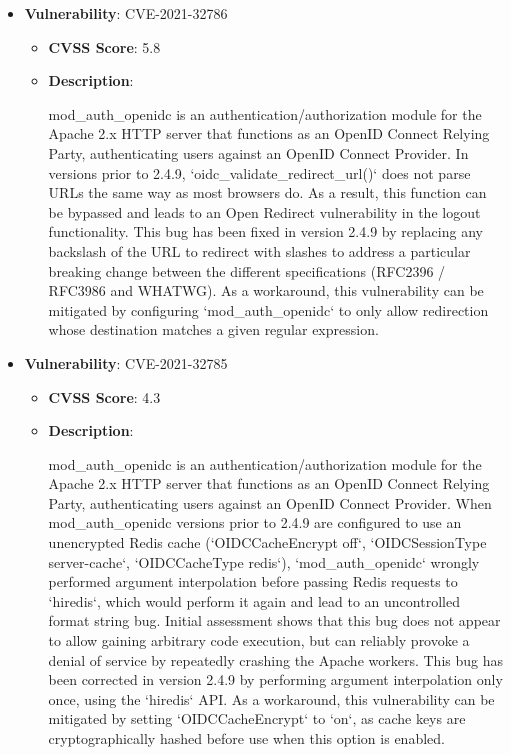 \documentclass{article}
\begin{document}
\begin{itemize}
        \item \textbf{Vulnerability}: CVE-2021-32786
        \begin{itemize}
            \item \textbf{CVSS Score}:  5.8 
            \item \textbf{Description}:
            \parbox[t]{0.9\linewidth}{
                \ttfamily mod\_auth\_openidc is an authentication/authorization module for the Apache 2.x HTTP server that functions as an OpenID Connect Relying Party, authenticating users against an OpenID Connect Provider. In versions prior to 2.4.9, `oidc\_validate\_redirect\_url()` does not parse URLs the same way as most browsers do. As a result, this function can be bypassed and leads to an Open Redirect vulnerability in the logout functionality. This bug has been fixed in version 2.4.9 by replacing any backslash of the URL to redirect with slashes to address a particular breaking change between the different specifications (RFC2396 / RFC3986 and WHATWG). As a workaround, this vulnerability can be mitigated by configuring `mod\_auth\_openidc` to only allow redirection whose destination matches a given regular expression.
            }
        \end{itemize}
    
        \item \textbf{Vulnerability}: CVE-2021-32785
        \begin{itemize}
            \item \textbf{CVSS Score}:  4.3 
            \item \textbf{Description}:
            \parbox[t]{0.9\linewidth}{
                \ttfamily mod\_auth\_openidc is an authentication/authorization module for the Apache 2.x HTTP server that functions as an OpenID Connect Relying Party, authenticating users against an OpenID Connect Provider. When mod\_auth\_openidc versions prior to 2.4.9 are configured to use an unencrypted Redis cache (`OIDCCacheEncrypt off`, `OIDCSessionType server-cache`, `OIDCCacheType redis`), `mod\_auth\_openidc` wrongly performed argument interpolation before passing Redis requests to `hiredis`, which would perform it again and lead to an uncontrolled format string bug. Initial assessment shows that this bug does not appear to allow gaining arbitrary code execution, but can reliably provoke a denial of service by repeatedly crashing the Apache workers. This bug has been corrected in version 2.4.9 by performing argument interpolation only once, using the `hiredis` API. As a workaround, this vulnerability can be mitigated by setting `OIDCCacheEncrypt` to `on`, as cache keys are cryptographically hashed before use when this option is enabled.
            }
        \end{itemize}
    

\end{itemize}
\end{document}
